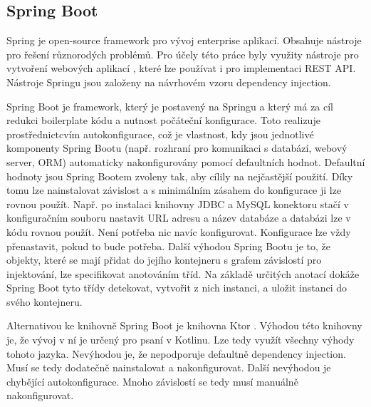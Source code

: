 \subsection*{Spring Boot}
Spring je open-source framework pro vývoj enterprise aplikací. Obsahuje nástroje pro řešení různorodých problémů. Pro účely této práce byly využity nástroje pro vytvoření webových \linebreak aplikací \cite{spring-web}, které lze používat i pro implementaci REST API. Nástroje Springu jsou založeny na návrhovém vzoru dependency injection.

Spring Boot je framework, který je postavený na Springu a který má za cíl redukci boilerplate kódu a nutnost počáteční konfigurace. Toto realizuje prostřednictcvím \linebreak autokonfigurace, což je vlastnost, kdy jsou jednotlivé komponenty Spring Bootu (např. rozhraní pro komunikaci s databází, webový server, ORM) automaticky nakonfigurovány pomocí defaultních hodnot. Defaultní hodnoty jsou Spring Bootem zvoleny tak, aby cílily na nejčastější použití. Díky tomu lze nainstalovat závislost a s minimálním zásahem do konfigurace ji lze rovnou použít. Např. po instalaci knihovny JDBC a MySQL konektoru stačí v konfiguračním souboru nastavit URL adresu a název databáze a databázi lze v kódu rovnou použít. Není potřeba nic navíc konfigurovat. Konfigurace lze vždy přenastavit, pokud to bude potřeba. Další výhodou Spring Bootu je to, že objekty, které se mají přidat do jejího kontejneru s grafem závislostí pro injektování, lze specifikovat anotováním tříd. Na základě určitých anotací dokáže Spring Boot tyto třídy detekovat, vytvořit z nich instanci, a uložit instanci do svého kontejneru.

Alternativou ke knihovně Spring Boot je knihovna Ktor \cite{ktor}. Výhodou této knihovny je, že vývoj v ní je určený pro psaní v Kotlinu. Lze tedy využít všechny výhody tohoto jazyka. Nevýhodou je, že nepodporuje defaultně dependency injection. Musí se tedy dodatečně nainstalovat a nakonfigurovat. Další nevýhodou je chybějící autokonfigurace. Mnoho závislostí se tedy musí manuálně nakonfigurovat.

